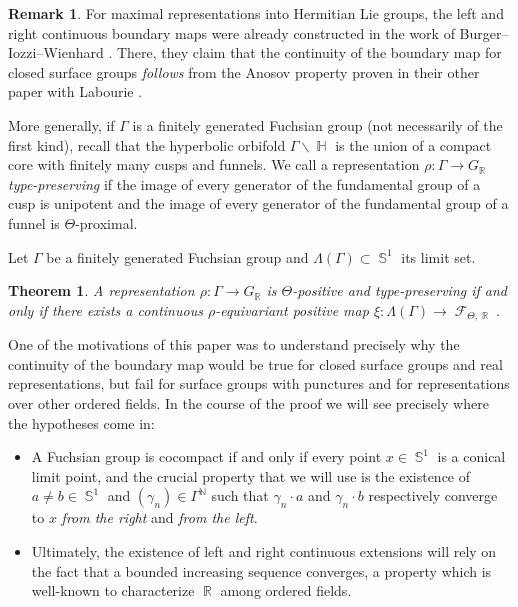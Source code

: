 \documentclass{amsart}
\theoremstyle{plain}
\newtheorem{ThmIntro}{Theorem}
\theoremstyle{definition}
\newtheorem{remark}[proposition]{Remark}
\DeclareMathOperator{\N}{{\mathbb{N}}}
\DeclareMathOperator{\Fc}{\mathcal{F}}
\DeclareMathOperator{\Hb}{\mathbb{H}}
\DeclareMathOperator{\Rb}{{\mathbb{R}}}
\DeclareMathOperator{\Sb}{\mathbb{S}}
\newcommand{\1}{\mathbf{1}}
\begin{document}
\begin{remark}
      For maximal representations into Hermitian Lie groups, the left and right continuous boundary maps were already constructed in the work of Burger--Iozzi--Wienhard \cite{BIW03,BIW10}. There, they claim that the continuity of the boundary map for closed surface groups \emph{follows} from the Anosov property proven in their other paper with Labourie \cite{BILW}.
\end{remark}

More generally, if $\Gamma$ is a finitely generated Fuchsian group (not necessarily of the first kind), recall that the hyperbolic orbifold $\Gamma\backslash \Hb$ is the union of a compact core with finitely many cusps and funnels. We call a representation $\rho\colon \Gamma \to G_{\Rb}$ \emph{type-preserving} if the image of every generator of the fundamental group of a cusp is unipotent and the image of every generator of the fundamental group of a funnel is $\Theta$-proximal.

Let $\Gamma$ be a finitely generated Fuchsian group and $\Lambda(\Gamma)\subset \Sb^1$ its limit set.

\begin{ThmIntro}\label{thm-intro: type preserving}
    A representation $\rho \colon \Gamma \to G_{\Rb}$ is $\Theta$-positive and type-preserving if and only if there exists a continuous $\rho$-equivariant positive map $\xi \colon \Lambda(\Gamma) \to \Fc_{\Theta,\Rb}$.
\end{ThmIntro}

One of the motivations of this paper was to understand precisely why the continuity of the boundary map would be true for closed surface groups and real representations, but fail for surface groups with punctures and for representations over other ordered fields. In the course of the proof we will see precisely where the hypotheses come in: 
\begin{itemize}
    \item A Fuchsian group is cocompact if and only if every point $x\in \Sb^1$ is a conical limit point, and the crucial property that we will use is the existence of $a\neq b\in \Sb^1$ and $(\gamma_n)\in \Gamma^{\N}$ such that $\gamma_n \cdot a$ and $\gamma_n \cdot b$ respectively converge to $x$ \emph{from the right} and \emph{from the left}.
    \item Ultimately, the existence of left and right continuous extensions will rely on the fact that a bounded increasing sequence converges, a property which is well-known to characterize $\Rb$ among ordered fields.
\end{itemize}
\end{document}
